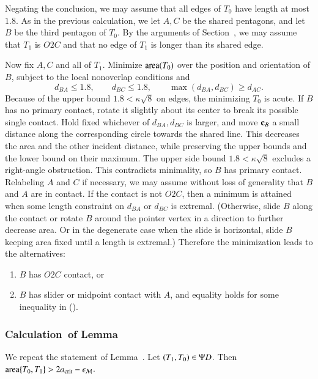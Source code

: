 Negating the conclusion, we may assume that all edges of $T_0$ have
length at most $1.8$.  As in the previous calculation, we let $A,C$ be
the shared pentagons, and let $B$ be the third pentagon of $T_0$.
By the arguments of Section~, we may assume that $T_1$
is $O2C$ and that no edge of $T_1$ is longer than its shared edge.

Now fix $A,C$ and all of $T_1$.
Minimize \({\operatorname{area}}(T_0)\) over the position and
orientation of \(B\), subject to the local nonoverlap conditions and
\begin{equation}\label{eqn:pseudo2-constraint}
d_{BA}\le1.8,\qquad d_{BC}\le1.8,\qquad \max(d_{BA},d_{BC})\ge d_{AC}.
\end{equation}
Because of the upper bound $1.8 < \kappa\sqrt8$ on edges, the minimizing
$T_0$ is acute.
If $B$ has no primary contact, rotate it slightly about its center
to break its possible single contact. Hold fixed whichever of
$d_{BA},d_{BC}$ is larger, and move ${\mathbf c}_B$ a small distance along the
corresponding circle towards the shared line. This decreases the
area and the other incident distance, while preserving the upper
bounds and the lower bound on their maximum. The upper side bound
$1.8<\kappa\sqrt8$ excludes a right-angle obstruction. This
contradicts minimality, so $B$ has primary contact.  Relabeling $A$ and $C$ if necessary, we may assume
without loss of generality that $B$ and $A$ are in contact.
If the contact is not $O2C$, then a minimum
is attained when some length constraint on $d_{BA}$ or $d_{BC}$
is extremal. (Otherwise, slide $B$ along the contact or rotate $B$ around the
pointer vertex in a direction to further decrease area. Or in the degenerate
case when the slide is horizontal, slide $B$ keeping area fixed until a
length is extremal.)
Therefore the minimization leads to the alternatives:
\begin{enumerate}
\item  $B$ has $O2C$ contact, or
\item $B$ has slider or midpoint contact with $A$, and
  equality holds for some inequality in ().
\end{enumerate}

\subsubsection{Calculation~of Lemma~} 

We repeat the statement of Lemma~.
Let $(T_1,T_0)\in\Psi D$.  Then ${\operatorname{area}}\{T_0,T_1\} > 2a_\text{crit} - \epsilon_{\mathcal M}$.


